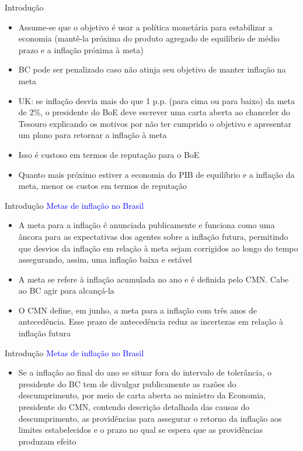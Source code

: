 \documentclass[10pt]{beamer}
\begin{document}
\begin{frame}
    {Introdução}
    \medskip
    \begin{itemize}
        \item Assume-se que o objetivo é usar a política monetária para estabilizar a economia (mantê-la próxima do produto agregado de equilíbrio de médio prazo e a inflação próxima à meta)\bigskip
        \item BC pode ser penalizado caso não atinja seu objetivo de manter inflação na meta\bigskip
        \item UK: se inflação desvia mais do que 1 p.p. (para cima ou para baixo) da meta de 2\%, o presidente do BoE deve escrever uma carta aberta ao chanceler do Tesouro explicando os motivos por não ter cumprido o objetivo e apresentar um plano para retornar a inflação à meta\bigskip
        \item Isso é custoso em termos de reputação para o BoE\bigskip
        \item Quanto mais próximo estiver a economia do PIB de equilíbrio e a inflação da meta, menor os custos em termos de reputação
    \end{itemize}
\end{frame}

\begin{frame}
    {Introdução}
    \textcolor{blue}{Metas de inflação no Brasil}\medskip
    \begin{itemize}
        \item A meta para a inflação é anunciada publicamente e funciona como uma âncora para as expectativas dos agentes sobre a inflação futura, permitindo que desvios da inflação em relação à meta sejam corrigidos ao longo do tempo assegurando, assim, uma inflação baixa e estável\bigskip
        \item A meta se refere à inflação acumulada no ano e é definida pelo CMN. Cabe ao BC agir para alcançá-la\bigskip
        \item O CMN define, em junho, a meta para a inflação com três anos de antecedência. Esse prazo de antecedência reduz as incertezas em relação à inflação futura
    \end{itemize}
\end{frame}

\begin{frame}
    {Introdução}
    \textcolor{blue}{Metas de inflação no Brasil}\medskip
    \begin{itemize}
        \item Se a inflação ao final do ano se situar fora do intervalo de tolerância, o presidente do BC tem de divulgar publicamente as razões do descumprimento, por meio de carta aberta ao ministro da Economia, presidente do CMN, contendo descrição detalhada das causas do descumprimento, as providências para assegurar o retorno da inflação aos limites estabelecidos e o prazo no qual se espera que as providências produzam efeito
    \end{itemize}
\end{frame}
\end{document}
